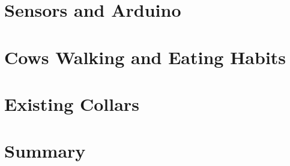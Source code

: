 \section{Sensors and Arduino}
\label{sec:sensors_and_arduino}

\section{Cows Walking and Eating Habits}
\label{sec:cows}

\section{Existing Collars}
\label{sec:existing_collars}

\section{Summary}
\label{sec:summary}





